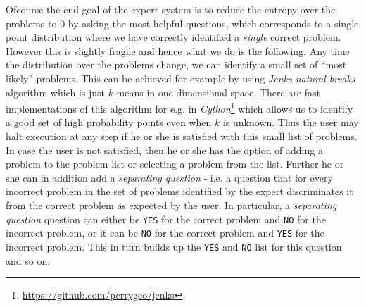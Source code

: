 \documentclass[a4paper,10pt]{article}
\begin{document}
Ofcourse the end goal of the expert system is to reduce the entropy over the problems to \(0\) by
asking the most helpful questions, which corresponds
to a single point distribution where we have correctly identified a \emph{single} correct problem. However this is slightly
fragile and hence what we do is the following. Any time the distribution over the problems change, we can identify
a small set of ``most likely'' problems. This can be achieved for example by using \emph{Jenks natural breaks}
algorithm which is just \(k\)-means in one dimensional space. There are fast implementations
of this algorithm for e.g. in \emph{Cython}\footnote{\url{https://github.com/perrygeo/jenks}} 
which allows us to identify a good set of high probability 
points even when \(k\) is unknown. Thus the user may halt execution at any step if he or she is satisfied
with this small list of problems. In case the user is not satisfied, then he or she has the
option of adding a problem to the problem list or selecting a problem from the list. Further
he or she can in addition add a \emph{separating question} - i.e. a question that for every incorrect problem
in the set of problems identified by the expert discriminates it from the correct problem as expected by the
user. In particular, a \emph{separating question} question can either be \texttt{YES} for the correct problem
and \texttt{NO} for the incorrect problem, or it can be \texttt{NO} for the correct problem and 
\texttt{YES} for the incorrect problem. This in turn builds up the \texttt{YES} and \texttt{NO} list
for this question and so on.
\end{document}
